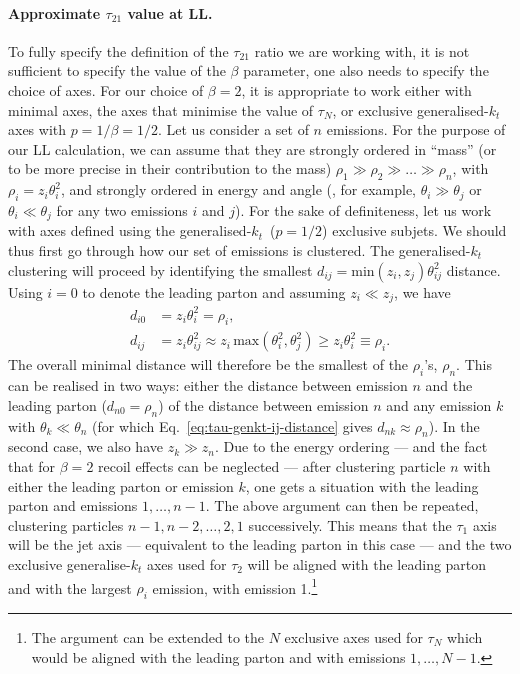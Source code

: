 \paragraph{Approximate $\tau_{21}$ value at LL.}
%
To fully specify the definition of the $\tau_{21}$ ratio we are working with, it is not
sufficient to specify the value of the $\beta$ parameter, one also
needs to specify the choice of axes. For our choice of $\beta=2$, it
is appropriate to work either with minimal axes, \ie the axes that
minimise the value of $\tau_N$, or exclusive generalised-$k_t$ axes
with $p=1/\beta=1/2$. 
Let us consider a set of $n$ emissions. For the purpose of our LL
calculation, we can assume that they are strongly ordered in ``mass'' (or to be more precise in their contribution to the mass)
\ie $\rho_1\gg\rho_2\gg\dots\gg\rho_n$, with $\rho_i=z_i\theta_i^2$,
and strongly ordered in energy and angle (\ie, for example,
$\theta_i\gg\theta_j$ or $\theta_i\ll\theta_j$ for any two emissions
$i$ and $j$).
%
For the sake of definiteness, let us work with axes defined using the
generalised-$k_t$~($p=1/2$) exclusive subjets.
%
We should thus first go through how our set of emissions is clustered.
%
The generalised-$k_t$ clustering will proceed by identifying the
smallest $d_{ij}=\text{min}(z_i,z_j)\theta_{ij}^2$ distance.
%
Using $i=0$ to denote the leading parton and assuming $z_i\ll z_j$, we have
\begin{align}
  d_{i0} & = z_i\theta_i^2 = \rho_i,\\
  d_{ij} & = z_i\theta_{ij}^2
           \approx z_i\,\text{max}(\theta_i^2,\theta_j^2)
           \ge  z_i\theta_i^2 \equiv \rho_i.\label{eq:tau-genkt-ij-distance}
\end{align}
The overall minimal distance will therefore be the smallest of the
$\rho_i$'s, \ie $\rho_n$. This can be realised in two ways: either the
distance between emission $n$ and the leading parton ($d_{n0}=\rho_n$)
of the distance between emission $n$ and any emission $k$ with
$\theta_k\ll\theta_n$ (for which Eq.~\eqref{eq:tau-genkt-ij-distance}
gives $d_{nk}\approx\rho_n$). In the second case, we also have
$z_k\gg z_n$. Due to the energy ordering --- and the fact that for
$\beta=2$ recoil effects can be neglected --- after clustering
particle $n$ with either the leading parton or emission $k$, one gets
a situation with the leading parton and emissions $1,\dots,n-1$. The
above argument can then be repeated, clustering particles
$n-1,n-2,\dots,2,1$ successively.
%
This means that the $\tau_1$ axis will be the jet axis --- equivalent
to the leading parton in this case --- and the two exclusive
generalise-$k_t$ axes used for $\tau_2$ will be aligned with the
leading parton and with the largest $\rho_i$ emission, \ie with
emission 1.\footnote{The argument can be extended to the $N$ exclusive
axes used for $\tau_N$ which would be aligned with the leading parton
and with emissions $1,\dots,N-1$.}

